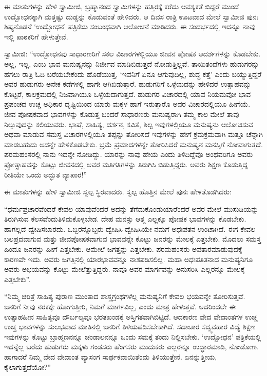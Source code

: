  ಈ ಮಾತುಗಳನ್ನು ಹೇಳಿ ಸ್ವಾಮೀಜಿ, ಬ್ರಹ್ಮಾನಂದ ಸ್ವಾಮಿಗಳನ್ನು ಹತ್ತಿರಕ್ಕೆ ಕರೆದು ಆವಶ್ಯಕತೆ ಬಿದ್ದರೆ ಮುಂದೆ ಉದ್ಬೋಧನಕ್ಕಾಗಿ ಮತ್ತಷ್ಟು ದುಡ್ಡನ್ನು ಕೊಡುವಂತೆ ಹೇಳಿದರು. ಆ ದಿವಸ ರಾತ್ರಿ ಊಟವಾದ ಮೇಲೆ ಸ್ವಾಮೀಜಿ ಪುನಃ ಶಿಷ್ಯನೊಡನೆ ‘ಉದ್ಬೋಧನ’ ಪತ್ರಿಕೆಯ ಸಂಬಂಧವಾಗಿ ಆಲೋಚನೆ ಮಾಡಿದರು. ಈ ಸಂದರ್ಭದಲ್ಲಿ ಇದನ್ನೂ ನಾವು ಇಲ್ಲಿ ಪಾಠಕರಿಗೆ ಹೇಳುತ್ತೇವೆ. 

 ಸ್ವಾಮೀಜಿ: “ಉದ್ಬೋಧನವು ಸಾಧಾರಣರಿಗೆ ಸಕಲ ವಿಚಾರಗಳಲ್ಲಿಯೂ ಜೀವನ ಪೋಷಕ ಆದರ್ಶಗಳನ್ನು ಕೊಡಬೇಕು. ಅಲ್ಲ, ಇಲ್ಲ, ಎಂಬ ಭಾವ ಮನುಷ್ಯನನ್ನು ನಿರ್ಜೀವ ಮಾಡಿಬಿಡುತ್ತದೆ ನೋಡುತ್ತಿಲ್ಲವೆ. ತಾಯಿತಂದೆಗಳು ಹುಡುಗರನ್ನು ಹಗಲು ರಾತ್ರಿ ಓದಿ ಬರೆಯಬೇಕೆಂದು ಹೊಡೆಯುತ್ತ, ‘ಇವನಿಗೆ ಏನೂ ಆಗುವುದಿಲ್ಲ, ಶುದ್ಧ ಕತ್ತೆ’ ಎಂದು ಬಯ್ಯುತ್ತಿದ್ದರೆ ಅವರ ಹುಡುಗರು ಅನೇಕ ಕಡೆಗಳಲ್ಲಿ ಹಾಗೇ ಆಗಿಬಿಡುತ್ತಾರೆ. ಹುಡುಗರಿಗೆ ಒಳ್ಳೆಯದನ್ನು ಹೇಳಿದರೆ ಉತ್ಸಾಹವನ್ನು ಕೊಟ್ಟರೆ, ಕಾಲಕ್ರಮದಲ್ಲಿ ನಿಜವಾಗಿಯೂ ಒಳ್ಳೆಯದಾಗುತ್ತದೆ. ಹುಡುಗರ ವಿಚಾರದಲ್ಲಿ ಯಾವ ನಿಯಮವೋ ಭಾವ ಪ್ರಪಂಚದ ಉಚ್ಚ ಅಧಿಕಾರ ದೃಷ್ಟಿಯಿಂದ ಯಾರು ಮಕ್ಕಳ ಹಾಗೆ ಇರುತ್ತಾರೊ ಅವರ ವಿಚಾರದಲ್ಲಿಯೂ ಹೀಗೆಯೆ. ಜೀವ ಪೋಷಕವಾದ ಭಾವಗಳನ್ನು ಕೊಡುತ್ತ ಬಂದರೆ ಸಾಧಾರಣರು ಮನುಷ್ಯರಾಗಿ ತಮ್ಮ ಕಾಲ ಮೇಲೆ ತಾವು ನಿಲ್ಲುವುದನ್ನು ಕಲಿಯುವರು. ಭಾಷೆ, ಸಾಹಿತ್ಯ, ದರ್ಶನ, ಕವಿತೆ, ಶಿಲ್ಪ ಇವುಗಳಲ್ಲಿಯೂ ಮನುಷ್ಯನು ಆಲೋಚಿಸುವ ಅಥವಾ ಮಾಡುವ ಸಮಸ್ತ ವಿಚಾರಗಳಲ್ಲಿಯೂ ತಪ್ಪನ್ನು ತೋರಿಸದೆ ಇವುಗಳನ್ನು ಹೇಗೆ ಕ್ರಮಕ್ರಮವಾಗಿ ಮತ್ತೂ ಚೆನ್ನಾಗಿ ಮಾಡಬಹುದು ಅದನ್ನೇ ಹೇಳಿಕೊಡಬೇಕು. ಭ್ರಮೆ ಪ್ರಮಾದಗಳನ್ನೇ ತೋರಿಸಿದರೆ ಮನುಷ್ಯನ ಮನಸ್ಸಿಗೆ ನೋವಾಗುತ್ತದೆ. ಪರಮಹಂಸರಲ್ಲಿ ನಾನು ಇದನ್ನೇ ನೋಡಿದ್ದು. ಯಾರನ್ನು ನಾವು ಹೇಯ ಎಂದು ತಿಳಿದಿದ್ದೆವೊ ಅಂಥವರಿಗೂ ಅವರು ಪ್ರೋತ್ಸಾಹವನ್ನು ಕೊಟ್ಟು ಜೀವನದಲ್ಲಿ ಅವರ ಮತಿಗತಿಗಳನ್ನು ತಿರುಗಿಸಿ ಬಿಡುತ್ತಿದ್ದರು. ಅವರು ಶಿಕ್ಷಣ ಕೊಡುತ್ತಿದ್ದ ರೀತಿಯೇ ಒಂದು ಅದ್ಭುತ ವ್ಯಾಪಾರ!” 

 ಈ ಮಾತುಗಳನ್ನು ಹೇಳಿ ಸ್ವಾಮೀಜಿ ಸ್ವಲ್ಪ ಸ್ಥಿರವಾದರು. ಸ್ವಲ್ಪ ಹೊತ್ತಿನ ಮೇಲೆ ಪುನಃ ಹೇಳತೊಡಗಿದರು: 

 “ಧರ್ಮಪ್ರಚಾರವೆಂದರೆ ಕೇವಲ ಯಾವುವೆಂದರೆ ಅದನ್ನು ತೆಗೆದುಕೊಂಡು\break ಯಾರೆಂದರೆ ಅವರ ಮೇಲೆ ಮುಸುಡಿಯನ್ನು ತಿರುಗಿಸುವ ಕೆಲಸವೆಂದು\break ತಿಳಿದುಕೊಳ್ಳಬೇಡ. ದೇಹ ಮನಸ್ಸು ಆತ್ಮ ಎಲ್ಲಕ್ಕೂ ಪೋಷಕ ಭಾವಗಳನ್ನು ಕೊಡಬೇಕು. ಹಾಗಲ್ಲದೆ ದ್ವೇಷಿಸಬಾರದು. ಒಬ್ಬರನ್ನೊಬ್ಬರು ದ್ವೇಷಿಸಿ ದ್ವೇಷಿಸಿಯೇ ನಮಗೆ ಅಧಃಪತನ ಉಂಟಾಗಿದೆ. ಈಗ ಕೇವಲ ಬಲಪ್ರದವಾಗುವ ಮತ್ತು ಜೀವಪೋಷಕವಾಗುವ ಭಾವವನ್ನೇ ಕೊಟ್ಟು ಜನರನ್ನು ಮೇಲಕ್ಕೆ ಎತ್ತಬೇಕು. ಮೊದಲು ಸಮಸ್ತ ಹಿಂದೂ ಜನರನ್ನು ಹೀಗೆ ಎತ್ತಬೇಕು. ಆಮೇಲೆ ಜಗತ್ತನ್ನು ಎತ್ತಬೇಕು. ಪರಮಹಂಸರು ಅವತಾರಮಾಡುವುದಕ್ಕೆ ಕಾರಣವೇ ಇದು. ಅವರು ಜಗತ್ತಿನಲ್ಲಿ ಯಾರಭಾವವನ್ನೂ ನಾಶಪಡಿಸಲಿಲ್ಲ. ಮಹಾ ಅಧಃಪತಿತನಾದ ಮನುಷ್ಯನಿಗೂ ಅವರು ಅಭಯವನ್ನು ಕೊಟ್ಟು ಮೇಲೆತ್ತುತ್ತಿದ್ದರು. ನಾವೂ ಅವರ ಮಾರ್ಗವನ್ನು ಅನುಸರಿಸಿ ಎಲ್ಲರನ್ನೂ ಮೇಲಕ್ಕೆ ಎತ್ತಬೇಕು”. 

 “ನಿಮ್ಮ ಚರಿತ್ರೆ ಸಾಹಿತ್ಯ ಪುರಾಣ ಮುಂತಾದ ಶಾಸ್ತ್ರಗ್ರಂಥಗಳೆಲ್ಲ ಮನುಷ್ಯನಿಗೆ ಕೇವಲ ಭಯವನ್ನೇ ತೋರಿಸುತ್ತವೆ. ಜನರಿಗೆ ನೀವು ನರಕಕ್ಕೇ ಹೋಗುತ್ತೀರಿ, ನಿಮಗೆ ಮಾರ್ಗವಿಲ್ಲ, ಎಂದು ಮಾತ್ರ ಹೇಳುತ್ತವೆ. ಅದರಿಂದಲೇ ಈ ಉತ್ಸಾಹಹೀನ ಸಾಹಿತ್ಯವೂ ದೌರ್ಬಲ್ಯವೂ ಭರತಖಂಡಕ್ಕೆ ಅಸ್ತಿಗತವಾಗಿಬಿಟ್ಟಿದೆ. ಆದಕಾರಣ ವೇದ ವೇದಾಂತಗಳ ಉಚ್ಚ ಉಚ್ಚ ಭಾವಗಳನ್ನು ಸುಲಭವಾದ ಮಾತಿನಲ್ಲಿ ಜನರಿಗೆ ತಿಳಿಯಪಡಿಸಬೇಕಾಗಿದೆ. ಸದಾಚಾರ ಸದ್ವ್ಯವಹಾರ ವಿದ್ಯೆ ಶಿಕ್ಷಣ ಇವುಗಳನ್ನು ಕೊಟ್ಟು ಬ್ರಾಹ್ಮಣನನ್ನೂ ಚಂಡಾಲನನ್ನೂ ಒಂದು ಸಮಕ್ಕೆ ತಂದು ನಿಲ್ಲಿಸಬೇಕು. ‘ಉದ್ಬೋಧನ' ಪತ್ರಿಕೆಯಲ್ಲಿ ಇದನ್ನೆಲ್ಲ ಬರೆದು ಹುಡುಗರು ಮಕ್ಕಳು ಗಂಡಸರು ಹೆಂಗಸರು ಮುದುಕರು ಎಲ್ಲರನ್ನೂ ಉದ್ಧಾರಮಾಡಿ, ನೋಡೋಣ. ಹಾಗಾದರೆ ನಿಮ್ಮ ವೇದ ವೇದಾಂತ ವ್ಯಾಸಂಗ ಸಾರ್ಥಕವಾಯಿತೆಂದು ತಿಳಿಯುತ್ತೇನೆ. ಏನನ್ನುತ್ತೀಯ, ಕೈಲಾಗುತ್ತದೆಯೋ?” 

